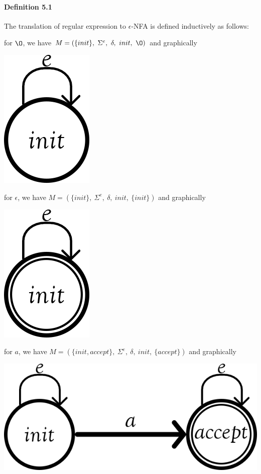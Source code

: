 \documentclass[twoside,openright,final]{bhamthesis}
\renewcommand{\item}{\itemindent0.5cm\itemold}
\begin{document}
\paragraph{Definition 5.1} The translation of regular expression to
\(\epsilon\)-NFA is defined inductively as follows:
\begin{enumerate}
  \item for \(\O\), we have \(M = (\{init\},\ \Sigma^e,\ \delta,\
    init,\ \O)\) and graphically \begin{center}\includegraphics{null}\end{center}
  \item for \(\epsilon\), we have \(M = (\{init\},\ \Sigma^e,\ \delta,\ init,\ \{init\})\) and graphically \begin{center}\includegraphics{epsilon}\end{center}
  \item for \(a\), we have \(M = (\{init, accept\},\ \Sigma^e,\ \delta,\ init,\ \{accept\})\) and graphically \begin{center}\includegraphics{singleton}\end{center}

\end{enumerate}
\end{document}
